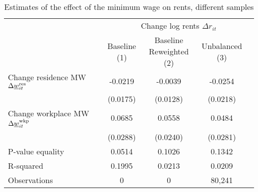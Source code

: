 \begin{table}[hbt!]
    \centering
    \caption{Estimates of the effect of the minimum wage on rents, different samples}
    \label{tab:static_sample}

    \begin{tabular}{@{}lccc@{}}
        \toprule
                                             & \multicolumn{4}{c}{Change log rents $\Delta r_{it}$}                   \\ \cmidrule(l){2-4} 
                                             & \shortstack{Baseline\\(1)}       & \shortstack{Baseline\\Reweighted (2)}
                                             & \shortstack{Unbalanced\\(3)}                                            \\ \midrule
        Change residence MW 
                  $\Delta\underline{w}_{it}^{\text{res}}$    & -0.0219      & -0.0039        & -0.0254         \\
                                             & (0.0175)    & (0.0128)      & (0.0218)       \\
        Change workplace MW 
                   $\Delta\underline{w}_{it}^{\text{wkp}}$   & 0.0685      & 0.0558        & 0.0484         \\
                                             & (0.0288)    & (0.0240)      & (0.0281)       \\ \midrule
        P-value equality                     & 0.0514      & 0.1026        & 0.1342         \\
        R-squared                            & 0.1995      & 0.0213        & 0.0209         \\
        Observations                         & 0     & 0       & 80,241        \\ \bottomrule
    \end{tabular}


\end{table}
